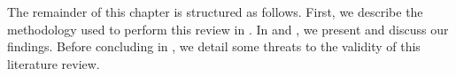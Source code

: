 The remainder of this chapter is structured as follows.
First, we describe the methodology used to perform this review in .
In  and , we present and discuss our findings.
Before concluding in , we detail some threats to the validity of this literature review.

